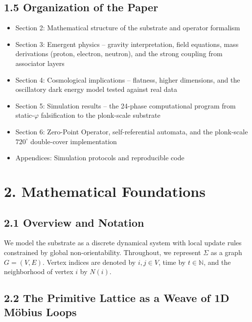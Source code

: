 \documentclass[
  11pt,
]{article}
\providecommand{\tightlist}{%
  \setlength{\itemsep}{0pt}\setlength{\parskip}{0pt}}
\begin{document}
\subsection{1.5 Organization of the
Paper}\label{organization-of-the-paper}

\begin{itemize}
\tightlist
\item
  Section 2: Mathematical structure of the substrate and operator
  formalism
\item
  Section 3: Emergent physics -- gravity interpretation, field
  equations, mass derivations (proton, electron, neutron), and the
  strong coupling from associator layers
\item
  Section 4: Cosmological implications -- flatness, higher dimensions,
  and the oscillatory dark energy model tested against real data
\item
  Section 5: Simulation results -- the 24-phase computational program
  from static-\(\varphi\) falsification to the plonk-scale substrate
\item
  Section 6: Zero-Point Operator, self-referential automata, and the
  plonk-scale \(720^{\circ}\) double-cover implementation
\item
  Appendices: Simulation protocols and reproducible code
\end{itemize}

\section{2. Mathematical Foundations}\label{mathematical-foundations}

\subsection{2.1 Overview and Notation}\label{overview-and-notation}

We model the substrate as a discrete dynamical system with local update
rules constrained by global non-orientability. Throughout, we represent
\(\Sigma\) as a graph \(G = (V, E)\). Vertex indices are denoted by
\(i, j \in V\), time by \(t \in \mathbb{N}\), and the neighborhood of
vertex \(i\) by \(N(i)\).

\subsection{2.2 The Primitive Lattice as a Weave of 1D Möbius
Loops}\label{the-primitive-lattice-as-a-weave-of-1d-muxf6bius-loops}
\end{document}
